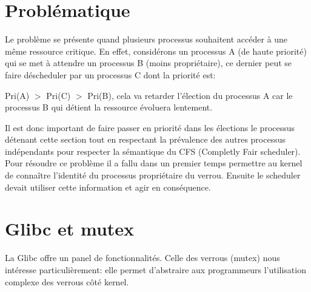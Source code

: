 \section*{Problématique}

Le problème se présente quand plusieurs processus souhaitent accéder à une même
ressource critique. En effet, considérons un processus A (de haute priorité) qui
se met à attendre un processus B (moins propriétaire), ce dernier peut se faire déscheduler
par un processus C dont la priorité est: 

Pri(A) $>$ Pri(C) $>$ Pri(B), cela va retarder
l'élection du processus A car le processus B qui détient la ressource 
évoluera lentement. 

Il est donc important de faire passer en priorité dans les 
élections le processus détenant cette section tout en respectant la prévalence
des autres processus indépendants pour respecter la sémantique du CFS 
(Completly Fair scheduler).
\\

Pour résoudre ce problème il a fallu dans un premier temps permettre au
kernel de connaître l'identité du processus propriétaire du verrou.
Ensuite le scheduler devait utiliser cette information et agir en conséquence.
\\

\section*{Glibc et mutex}
La Glibc offre un panel de fonctionnalités. 
Celle des verrous (mutex) nous intéresse particulièrement: elle permet 
d'abstraire aux programmeurs l'utilisation complexe des verrous côté kernel.
\\

